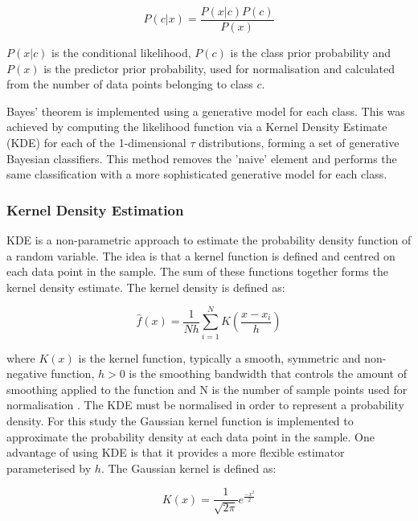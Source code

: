 \begin{equation} \label{naive-bayes}
    P(c|x) = \frac{P(x|c)P(c)}{P(x)}
\end{equation}

$P(x|c)$ is the conditional likelihood, $P(c)$ is the class prior probability and $P(x)$ is the predictor prior probability, used for normalisation and calculated from the number of data points belonging to class $c$.

Bayes' theorem is implemented using a generative model for each class. This was achieved by computing the likelihood function via a Kernel Density Estimate (KDE) for each of the 1-dimensional $\tau$ distributions, forming a set of generative Bayesian classifiers. This method removes the 'naive' element and performs the same classification with a more sophisticated generative model for each class.

\subsubsection{Kernel Density Estimation}

KDE is a non-parametric approach to estimate the probability density function of a random variable. The idea is that a kernel function is defined and centred on each data point in the sample. The sum of these functions together forms the kernel density estimate. The kernel density is defined as:
    
\begin{equation} \label{eq2}
    \hat{f}(x) = \frac{1}{Nh}  \sum_{i=1}^{N} K \left( \frac{x - x_i}{h} \right)
\end{equation}

where $K(x)$ is the kernel function, typically a smooth, symmetric and non-negative function, $h > 0$ is the smoothing bandwidth that controls the amount of smoothing applied to the function and N is the number of sample points used for normalisation \cite{kde}. The KDE must be normalised in order to represent a probability density. For this study the Gaussian kernel function is implemented to approximate the probability density at each data point in the sample. One advantage of using KDE is that it provides a more flexible estimator parameterised by $h$. The Gaussian kernel is defined as:
    
\begin{equation} \label{eq3}
    K(x) = \frac{1}{\sqrt{2\pi}} e^{\frac{-x^2}{2}}
\end{equation}

